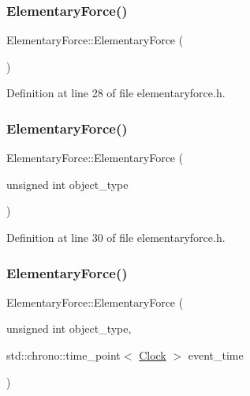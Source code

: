 \subsubsection{\texorpdfstring{Elementary\+Force()}{ElementaryForce()}\hspace{0.1cm}{\footnotesize\ttfamily [1/4]}}
{\footnotesize\ttfamily Elementary\+Force\+::\+Elementary\+Force (\begin{DoxyParamCaption}{ }\end{DoxyParamCaption})\hspace{0.3cm}{\ttfamily [inline]}}



Definition at line 28 of file elementaryforce.\+h.

\mbox{\label{class_elementary_force_a7aeb59eab2a299037e1fef94b9290b78}} 
\subsubsection{\texorpdfstring{Elementary\+Force()}{ElementaryForce()}\hspace{0.1cm}{\footnotesize\ttfamily [2/4]}}
{\footnotesize\ttfamily Elementary\+Force\+::\+Elementary\+Force (\begin{DoxyParamCaption}\item[{unsigned int}]{object\+\_\+type }\end{DoxyParamCaption})\hspace{0.3cm}{\ttfamily [inline]}}



Definition at line 30 of file elementaryforce.\+h.

\mbox{\label{class_elementary_force_a30f4a2259927de81cf3ef66c495f423c}} 
\subsubsection{\texorpdfstring{Elementary\+Force()}{ElementaryForce()}\hspace{0.1cm}{\footnotesize\ttfamily [3/4]}}
{\footnotesize\ttfamily Elementary\+Force\+::\+Elementary\+Force (\begin{DoxyParamCaption}\item[{unsigned int}]{object\+\_\+type,  }\item[{std\+::chrono\+::time\+\_\+point$<$ \mbox{\hyperlink{universe_8h_a0ef8d951d1ca5ab3cfaf7ab4c7a6fd80}{Clock}} $>$}]{event\+\_\+time }\end{DoxyParamCaption})\hspace{0.3cm}{\ttfamily [inline]}}



